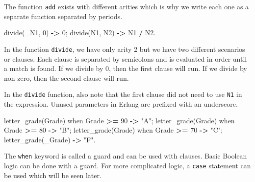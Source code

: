 \documentclass[
]{book}
\newenvironment{Shaded}{\begin{snugshade}}{\end{snugshade}}
\newcommand{\CharTok}[1]{\textcolor[rgb]{0.31,0.60,0.02}{#1}}
\newcommand{\DecValTok}[1]{\textcolor[rgb]{0.00,0.00,0.81}{#1}}
\newcommand{\FunctionTok}[1]{\textcolor[rgb]{0.00,0.00,0.00}{#1}}
\newcommand{\OperatorTok}[1]{\textcolor[rgb]{0.81,0.36,0.00}{\textbf{#1}}}
\newcommand{\StringTok}[1]{\textcolor[rgb]{0.31,0.60,0.02}{#1}}
\newcommand{\VariableTok}[1]{\textcolor[rgb]{0.00,0.00,0.00}{#1}}
\begin{document}
The function \texttt{add} exists with different arities which is why we write each one as a separate function separated by periods.

\begin{Shaded}
\begin{Highlighting}[]
\FunctionTok{divide(}\VariableTok{\_N1}\FunctionTok{,} \DecValTok{0}\FunctionTok{)} \OperatorTok{{-}\textgreater{}} \DecValTok{0}\FunctionTok{;}
\FunctionTok{divide(}\VariableTok{N1}\FunctionTok{,} \VariableTok{N2}\FunctionTok{)} \OperatorTok{{-}\textgreater{}} \VariableTok{N1} \OperatorTok{/} \VariableTok{N2}\FunctionTok{.}
\end{Highlighting}
\end{Shaded}

In the function \texttt{divide}, we have only arity 2 but we have two different scenarios or clauses. Each clause is separated by semicolons and is evaluated in order until a match is found. If we divide by 0, then the first clause will run. If we divide by non-zero, then the second clause will run.

In the \texttt{divide} function, also note that the first clause did not need to use \texttt{N1} in the expression. Unused parameters in Erlang are prefixed with an underscore.

\begin{Shaded}
\begin{Highlighting}[]
\FunctionTok{letter\_grade(}\VariableTok{Grade}\FunctionTok{)} \CharTok{when} \VariableTok{Grade} \OperatorTok{\textgreater{}=} \DecValTok{90} \OperatorTok{{-}\textgreater{}} \StringTok{"A"}\FunctionTok{;}
\FunctionTok{letter\_grade(}\VariableTok{Grade}\FunctionTok{)} \CharTok{when} \VariableTok{Grade} \OperatorTok{\textgreater{}=} \DecValTok{80} \OperatorTok{{-}\textgreater{}} \StringTok{"B"}\FunctionTok{;}
\FunctionTok{letter\_grade(}\VariableTok{Grade}\FunctionTok{)} \CharTok{when} \VariableTok{Grade} \OperatorTok{\textgreater{}=} \DecValTok{70} \OperatorTok{{-}\textgreater{}} \StringTok{"C"}\FunctionTok{;}
\FunctionTok{letter\_grade(}\VariableTok{\_Grade}\FunctionTok{)} \OperatorTok{{-}\textgreater{}} \StringTok{"F"}\FunctionTok{.}
\end{Highlighting}
\end{Shaded}

The \texttt{when} keyword is called a guard and can be used with clauses. Basic Boolean logic can be done with a guard. For more complicated logic, a \texttt{case} statement can be used which will be seen later.
\end{document}
